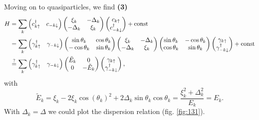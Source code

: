 Moving on to quasiparticles, we find \textbf{(3)}
\begin{align*}
	H &= \sum_k \begin{pmatrix}
		c_{k \uparrow}^{\dag} & c_{-k \downarrow}
	\end{pmatrix}
	 \begin{pmatrix}
	     \xi_k & -\Delta_k \\
	     -\Delta_k & \xi_k \\
	 \end{pmatrix}
	 \begin{pmatrix}
	 	c_{k \uparrow} \\ c_{-k \downarrow}^{\dag}
	 \end{pmatrix} + \textnormal{const} \\
	 &= \sum_k \begin{pmatrix}
	 	\gamma_{k \uparrow}^{\dag} & \gamma_{-k \downarrow} 
	 \end{pmatrix} \begin{pmatrix}
	    \sin \theta_k & \cos \theta_k \\
	    -\cos \theta_k & \sin \theta_k \\
	\end{pmatrix}  \begin{pmatrix}
	     \xi_k & -\Delta_k \\
	     -\Delta_k & \xi_k \\
	 \end{pmatrix} 
	 \begin{pmatrix}
	    \sin \theta_k & -\cos \theta_k \\
	    \cos \theta_k & \sin \theta_k \\
	\end{pmatrix}
	\begin{pmatrix}
		\gamma_{k \uparrow} \\ \gamma_{-k \downarrow}^{\dag}
	\end{pmatrix} + \textnormal{const}
	\\ 
	&\overset{\mathrm{?}}{=}  \sum_k \begin{pmatrix}
	 	\gamma_{k \uparrow}^{\dag} & \gamma_{-k \downarrow} 
	 \end{pmatrix} 
	 \begin{pmatrix}
	     \tilde{E}_k & 0 \\
	     0 & -\tilde{E}_k \\
	 \end{pmatrix}
	\begin{pmatrix}
		\gamma_{k \uparrow} \\ \gamma_{-k \downarrow}^{\dag}
	\end{pmatrix},
\end{align*}
with 
\begin{equation*}
	\tilde{E}_k =\xi_k  - 2 \xi_k \cos(\theta_k)^2 + 2 \Delta_k \sin \theta_k \cos \theta_k = \frac{\xi_k^2 + \Delta_k^2}{E_k} = E_k.
\end{equation*}
With $\Delta_k = \Delta$  we could plot the dispersion relation (fig. \ref{fig:131}).

